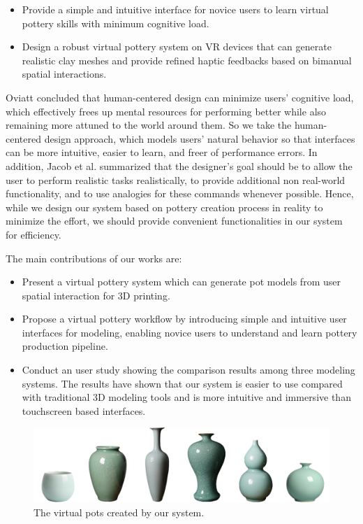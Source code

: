 \begin{itemize}
\item Provide a simple and intuitive interface for novice users to learn virtual pottery skills with minimum cognitive load.
\item Design a robust virtual pottery system on VR devices that can generate realistic clay meshes and provide refined haptic feedbacks based on bimanual spatial interactions.
\end{itemize}

Oviatt \cite{oviatt2006human} concluded that human-centered design can minimize users’ cognitive load, which effectively frees up mental resources for performing better while also remaining more attuned to the world around them.
So we take the human-centered design approach, which models users’ natural behavior so that interfaces can be more intuitive, easier to learn, and freer of performance errors.
In addition, Jacob et al. \cite{Jacob2008Reality} summarized that the designer's goal should be to allow the user to perform realistic tasks realistically, to provide additional non real-world functionality, and to use analogies for these commands whenever possible.
Hence, while we design our system based on pottery creation process in reality to minimize the effort, we should provide convenient functionalities in our system for efficiency.

The main contributions of our works are:

\begin{itemize}
\item Present a virtual pottery system which can generate pot models from user spatial interaction for 3D printing.
\item Propose a virtual pottery workflow by introducing simple and intuitive user interfaces for modeling, enabling novice users to understand and learn pottery production pipeline.
\item Conduct an user study showing the comparison results among three modeling systems. The results have shown that our system is easier to use compared with traditional 3D modeling tools and is more intuitive and immersive than touchscreen based interfaces.
\end{itemize}

\begin{figure}
\includegraphics[width=\textwidth]{targets.png}
\caption{The virtual pots created by our system.}
\label{fig:1}
\end{figure}

